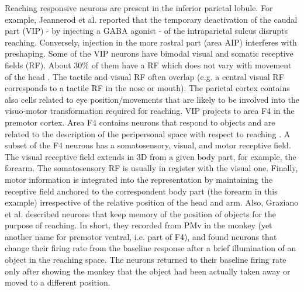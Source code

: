 Reaching responsive neurons are present in the inferior parietal lobule. For 
example, Jeannerod et al. \cite{jeannerod-arbib-rizzolatti-sakata-1995} reported 
that the temporary deactivation of the caudal part (VIP) - by injecting a GABA 
agonist - of the intraparietal sulcus 
disrupts reaching. Conversely, injection in the more rostral part (area AIP) interferes with 
preshaping. Some of the VIP neurons have bimodal visual and somatic receptive 
fields (RF). About 30\% of them have a RF which does not vary with 
movement of the head \cite{rizzolatti-fogassi-gallese-1997}. The tactile and 
visual RF often overlap (e.g. a central visual 
RF corresponds to a tactile RF in the nose or mouth). The parietal cortex contains 
also cells related to eye position/movements that are likely to be involved into 
the visuo-motor transformation required for reaching. VIP projects to area 
F4 in the premotor cortex. Area F4 contains neurons that respond to objects and 
are related to the description of the peripersonal space with respect to reaching 
\cite{graziano-hu-gross-1997}\cite{fogassi96coding}. A subset of the F4 neurons 
has a somatosensory, visual, and motor receptive field. The visual receptive 
field extends in 3D from a given body part, for example, the forearm. The somatosensory RF
is usually in register with the visual one. Finally, motor information
is integrated into the representation by maintaining the receptive
field anchored to the correspondent body part (the forearm in this
example) irrespective of the relative position of the head and arm.
Also, Graziano et al. \cite{graziano-cooke-taylor-2000} described neurons that keep 
memory of the position of objects for the purpose of reaching. In short, they 
recorded from PMv in the monkey (yet another name for premotor ventral, i.e. part 
of F4), and found neurons that change their firing rate from the baseline response 
after a brief illumination of an object in the reaching space. The neurons returned 
to their baseline firing rate only after showing the monkey that the object had been 
actually taken away or moved to a different position.

